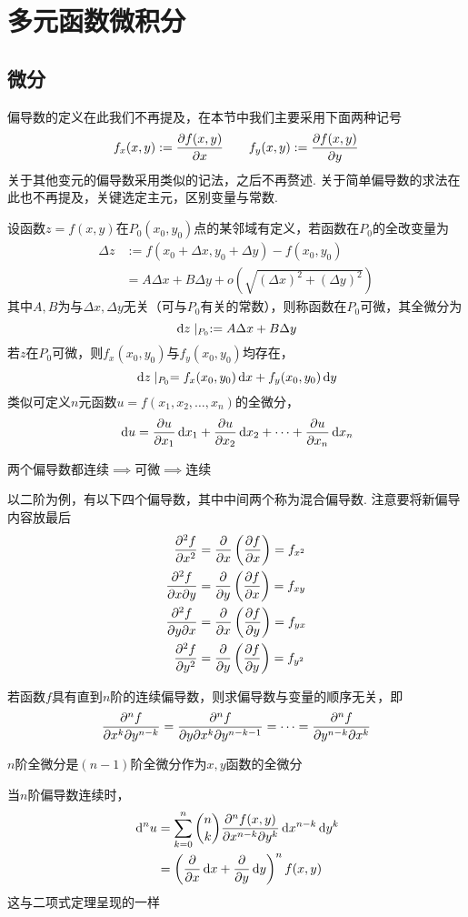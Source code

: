 
\section{多元函数微积分}
\subsection{微分}
偏导数的定义在此我们不再提及，在本节中我们主要采用下面两种记号
\[f_x(x,y):=\dfrac{\partial f(x,y)}{\partial x}\qquad f_y(x,y):=\dfrac{\partial f(x,y)}{\partial y}\]
关于其他变元的偏导数采用类似的记法，之后不再赘述.
关于简单偏导数的求法在此也不再提及，关键选定主元，区别变量与常数.
\begin{definition}[全微分]
设函数$z=f(x,y)$在$P_0(x_0,y_0)$点的某邻域有定义，若函数在$P_0$的全改变量为
\[\begin{aligned}
\Delta z&:=f(x_0+\Delta x,y_0+\Delta y)-f(x_0,y_0)\\
&=A\Delta x+B\Delta y+o(\sqrt{(\Delta x)^2+(\Delta y)^2})
\end{aligned}\]
其中$A,B$为与$\Delta x,\Delta y$无关（可与$P_0$有关的常数），则称函数在$P_0$可微，其全微分为
\[\,\mathrm{d} z\mid_{P_0}:=A\Delta x+B\Delta y\]
若$z$在$P_0$可微，则$f_x(x_0,y_0)$与$f_y(x_0,y_0)$均存在，
\[\,\mathrm{d} z\mid_{P_0}=f_x(x_0,y_0)\,\mathrm{d} x+f_y(x_0,y_0)\,\mathrm{d} y\]
类似可定义$n$元函数$u=f(x_1,x_2,\ldots,x_n)$的全微分，
\[\,\mathrm{d} u=\dfrac{\partial u}{\partial x_1}\,\mathrm{d} x_1+\dfrac{\partial u}{\partial x_2}\,\mathrm{d} x_2+\cdots+\dfrac{\partial u}{\partial x_n}\,\mathrm{d} x_n\]
\end{definition}
\begin{theorem}
两个偏导数都连续$\implies$可微$\implies$连续
\end{theorem}
\begin{definition}[高阶偏导数]
以二阶为例，有以下四个偏导数，其中中间两个称为混合偏导数. 注意要将新偏导内容放最后
\[\begin{aligned}
\dfrac{\partial^2 f}{\partial x^2}&=\dfrac{\partial }{\partial x}\left(\dfrac{\partial f}{\partial x}\right)=f_{x^2}\\
\dfrac{\partial^2 f}{\partial x\partial y}&=\dfrac{\partial }{\partial y}\left(\dfrac{\partial f}{\partial x}\right)=f_{xy}\\
\dfrac{\partial^2 f}{\partial y\partial x}&=\dfrac{\partial }{\partial x}\left(\dfrac{\partial f}{\partial y}\right)=f_{yx}\\
\dfrac{\partial^2 f}{\partial y^2}&=\dfrac{\partial }{\partial y}\left(\dfrac{\partial f}{\partial y}\right)=f_{y^2}
\end{aligned}\]
\end{definition}
\begin{theorem}[混合偏导数相等]
若函数$f$具有直到$n$阶的连续偏导数，则求偏导数与变量的顺序无关，即
\[\dfrac{\partial^n f}{\partial x^k\partial y^{n-k}}=\dfrac{\partial^n f}{\partial y\partial x^k\partial y^{n-k-1}}=\cdots=\dfrac{\partial^n f}{\partial y^{n-k}\partial x^{k}}\]
\end{theorem}
$n$阶全微分是$(n-1)$阶全微分作为$x,y$函数的全微分
\begin{theorem}[高阶全微分]
当$n$阶偏导数连续时，
\[\begin{aligned}
\,\mathrm{d}^n u&=\sum_{k=0}^n\binom{n}{k}\dfrac{\partial^n f(x,y)}{\partial x^{n-k}\partial y^k}\,\mathrm{d} x^{n-k}\,\mathrm{d} y^k\\
&=\left(\dfrac{\partial }{\partial x}\,\mathrm{d} x+\dfrac{\partial }{\partial y}\,\mathrm{d} y\right)^n f(x,y)
\end{aligned}\]
这与二项式定理呈现的一样
\end{theorem}


